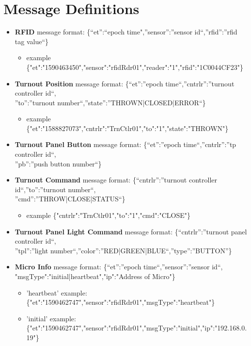 \section{Message Definitions}
\begin{itemize}
\item \textbf {\ac{RFID}} message format: \{“et”:“epoch time",”sensor”:”sensor id“,”rfid”:”rfid tag value“\}
\begin{itemize}
\item example \{"et":"1590463450","sensor":"rfidRdr01","reader":"1","rfid":"1C0044CF23"\}
\end{itemize}
\item \textbf {Turnout Position} message format: \{“et”:”epoch time“,”cntrlr”:”turnout controller id“, \\”to”:”turnout number“,”state”:”THROWN|CLOSED|ERROR“\}
\begin{itemize}
\item example \{"et":"1588827073","cntrlr":"TrnCtlr01","to":"1","state":"THROWN"\}
\end{itemize}
\item \textbf {Turnout Panel Button} message format: \{“et”:”epoch time“,”cntrlr”:”tp controller id“, \\”pb”:”push button number“\} 
\item \textbf {Turnout Command} message format: \{“cntrlr”:”turnout controller id“,”to”:”turnout number“, \\”cmd”:”THROW|CLOSE|STATUS“\}
\begin{itemize}
\item example \{"cntrlr":"TrnCtlr01","to":"1","cmd":"CLOSE"\}
\end{itemize}
\item \textbf {Turnout Panel Light Command} message format: \{“cntrlr”:”turnout panel controller id“, \\”tpl”:”light number“,”color”:”RED|GREEN|BLUE“,”type”:”BUTTON”\}
\item \textbf {Micro Info} message format: \{“et”:”epoch time“,”sensor”:”sensor id“, \\"msgType":"initial|heartbeat","ip":"Address of Micro"\}
\begin{itemize}
\item 'heartbeat' example: \{"et":"1590462747","sensor":"rfidRdr01","msgType":"heartbeat"\} 
\item 'initial' example: \{"et":"1590462747","sensor":"rfidRdr01","msgType":"initial","ip":"192.168.0.19"\}
\end{itemize}
\end{itemize}
